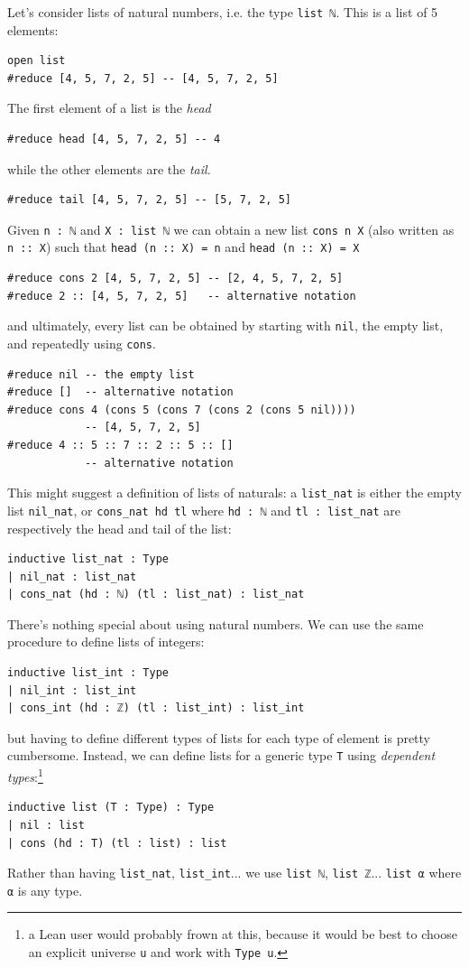 \documentclass{book}
\theoremstyle{definition}
\theoremstyle{remark}
\theoremstyle{plain}
\begin{document}
Let's consider lists of natural numbers, i.e. the type \lstinline{list ℕ}.
This is a list of 5 elements:
\begin{lstlisting}
open list
#reduce [4, 5, 7, 2, 5] -- [4, 5, 7, 2, 5]
\end{lstlisting}
The first element of a list is the \textit{head}
\begin{lstlisting}
#reduce head [4, 5, 7, 2, 5] -- 4
\end{lstlisting}
while the other elements are the \textit{tail}.
\begin{lstlisting}
#reduce tail [4, 5, 7, 2, 5] -- [5, 7, 2, 5]
\end{lstlisting}
Given \lstinline{n : ℕ} and \lstinline{X : list ℕ} we can obtain a new list
\lstinline{cons n X} (also written as \lstinline{n :: X}) such that
\lstinline{head (n :: X) = n} and \lstinline{head (n :: X) = X}
\begin{lstlisting}
#reduce cons 2 [4, 5, 7, 2, 5] -- [2, 4, 5, 7, 2, 5]
#reduce 2 :: [4, 5, 7, 2, 5]   -- alternative notation  
\end{lstlisting}
and ultimately, every list can be obtained by starting with \lstinline{nil},
the empty list, and repeatedly using \lstinline{cons}.
\begin{lstlisting}
#reduce nil -- the empty list
#reduce []  -- alternative notation 
#reduce cons 4 (cons 5 (cons 7 (cons 2 (cons 5 nil))))
            -- [4, 5, 7, 2, 5]
#reduce 4 :: 5 :: 7 :: 2 :: 5 :: []
            -- alternative notation
\end{lstlisting}
This might suggest a definition of lists of naturals:
a \lstinline{list_nat} is either the empty list \lstinline{nil_nat},
or \lstinline{cons_nat hd tl} where \lstinline{hd : ℕ} and \lstinline{tl : list_nat}
are respectively the head and tail of the list:
\begin{lstlisting}
inductive list_nat : Type
| nil_nat : list_nat
| cons_nat (hd : ℕ) (tl : list_nat) : list_nat
\end{lstlisting}
There's nothing special about using natural numbers.
We can use the same procedure to define lists of integers:
\begin{lstlisting}
inductive list_int : Type
| nil_int : list_int
| cons_int (hd : ℤ) (tl : list_int) : list_int
\end{lstlisting}
but having to define different types of lists for each type of element is pretty cumbersome.
Instead, we can define lists for a generic type \lstinline{T} using \textit{dependent types}:\footnote{a Lean user would probably frown at this,
because it would be best to choose an explicit universe \lstinline{u} and work with \lstinline{Type u}.}
\begin{lstlisting}
inductive list (T : Type) : Type
| nil : list
| cons (hd : T) (tl : list) : list
\end{lstlisting}
Rather than having \lstinline{list_nat}, \lstinline{list_int}...
we use \lstinline{list ℕ}, \lstinline{list ℤ}...
\lstinline{list α} where \lstinline{α} is any type.
\end{document}
